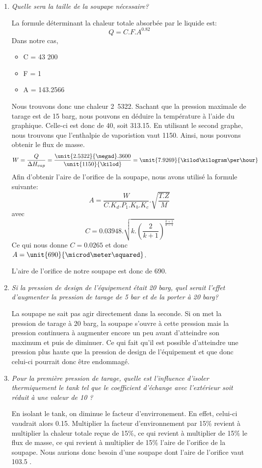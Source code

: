 \documentclass{report}
\begin{document}
\begin{enumerate}
\item\textit{Quelle sera la taille de la soupape nécessaire?}

La formule déterminant la chaleur totale absorbée par le liquide est: $$ Q = C.F.A^{0.82} $$
Dans notre cas,
\begin{itemize}
\item C = 43 200
\item F = 1
\item A = 143.2566 \meter\squared
\end{itemize}
Nous trouvons donc une chaleur \unit{2.5322}{\megad\watt}.
Sachant que la pression maximale de tarage est de 15 barg, nous pouvons en déduire la température à l'aide du graphique. Celle-ci est donc de 40\celsius, soit 313.15\kelvin. En utilisant le second graphe, nous trouvons que l'enthalpie de vaporistion vaut \unit{1150}{\kilo\joule\per\kilogram}. Ainsi, nous pouvons obtenir le flux de masse. $$ W = \frac{Q}{\Delta H_{vap}} = \frac{\unit{2.5322}{\megad}.3600}{\unit{1150}{\kilod}} = \unit{7.9269}{\kilod\kilogram\per\hour} $$
Afin d'obtenir l'aire de l'orifice de la soupape, nous avons utilisé la formule suivante:
$$ A = \frac{W}{C.K_d.P_1.K_b.K_c}.\sqrt{\frac{T.Z}{M}} $$ avec $$ C = 0.03948.\sqrt{k.(\frac{2}{k+1})^\frac{k+1}{k-1}} $$
Ce qui nous donne $ C = 0.0265$ et donc $A = \unit{690}{\microd\meter\squared}$.

L'aire de l'orifice de notre soupape est donc de \unit{690}{\microd\meter\squared}.

\item\textit{Si la pression de design de l'équipement était 20 barg, quel serait l'effet d'augmenter la pression de tarage de 5 bar et de la porter à 20 barg?}

La soupape ne sait pas agir directement dans la seconde. Si on met la pression de tarage à 20 barg, la soupape s'ouvre à cette pression mais la pression continuera à augmenter encore un peu avant d'atteindre son maximum et puis de diminuer. Ce qui fait qu'il est possible d'atteindre une pression plus haute que la pression de design de l'équipement et que donc celui-ci pourrait donc être endommagé.

\item\textit{Pour la première pression de tarage, quelle est l'influence d'isoler thermiquement le tank tel que le coefficient d'échange avec l'extérieur soit réduit à une valeur de 10 \watt\per\meter\squared\kelvin ?}

En isolant le tank, on diminue le facteur d'envirronement. En effet, celui-ci vaudrait alors 0.15. Multiplier la facteur d'environnement par 15\% revient à multiplier la chaleur totale reçue de 15\%, ce qui revient à multiplier de 15\% le flux de masse, ce qui revient à multiplier de 15\% l'aire de l'orifice de la soupape. Nous aurions donc besoin d'une soupape dont l'aire de l'orifice vaut 103.5 \microd\meter\squared.
\end{enumerate}
\end{document}
